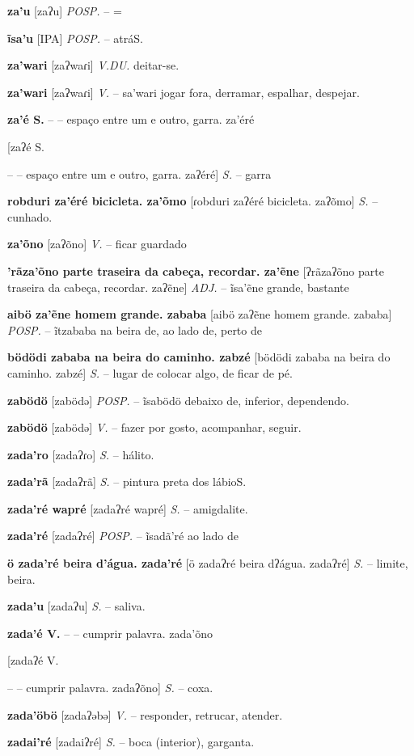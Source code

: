 {{{{{{{{{{{{\textbf{za'u} [zaʔu] \textit{POSP.} -- =

\textbf{ĩsa'u} [IPA] \textit{POSP.} -- atráS.}

\textbf{za'wari} [zaʔwaɾi] \textit{V.DU.} deitar-se.

\textbf{za'wari} [zaʔwaɾi] \textit{V.} -- sa'wari jogar fora, derramar, espalhar, despejar.

\textbf{za'é S.} -- -- espaço entre um e outro, garra. za'éré} [zaʔé S.} -- -- espaço entre um e outro, garra. zaʔéré] \textit{S.} -- garra

\textbf{robduri za'éré bicicleta. za'õmo} [ɾobduri zaʔéré bicicleta. zaʔõmo] \textit{S.} -- cunhado.

\textbf{za'õno} [zaʔõno] \textit{V.} -- ficar guardado

\textbf{'rãza'õno parte traseira da cabeça, recordar. za'ẽne} [ʔrãzaʔõno parte traseira da cabeça, recordar. zaʔẽne] \textit{ADJ.} -- ĩsa'ẽne grande, bastante

\textbf{aibö za'ẽne homem grande. zababa} [aibö zaʔẽne homem grande. zababa] \textit{POSP.} -- ĩtzababa na beira de, ao lado de, perto de

\textbf{bödödi zababa na beira do caminho. zabzé} [bödödi zababa na beira do caminho. zabzé] \textit{S.} -- lugar de colocar algo, de ficar de pé.

\textbf{zabödö} [zabödə] \textit{POSP.} -- ĩsabödö debaixo de, inferior, dependendo.

\textbf{zabödö} [zabödə] \textit{V.} -- fazer por gosto, acompanhar, seguir.

\textbf{zada'ro} [zadaʔɾo] \textit{S.} -- hálito.

\textbf{zada'rã} [zadaʔrã] \textit{S.} -- pintura preta dos lábioS.}

\textbf{zada'ré wapré} [zadaʔré wapré] \textit{S.} -- amigdalite.

\textbf{zada'ré} [zadaʔré] \textit{POSP.} -- ĩsadã'ré ao lado de

\textbf{ö zada'ré beira d'água. zada'ré} [ö zadaʔré beira dʔágua. zadaʔré] \textit{S.} -- limite, beira.

\textbf{zada'u} [zadaʔu] \textit{S.} -- saliva.

\textbf{zada'é V.} -- -- cumprir palavra. zada'õno} [zadaʔé V.} -- -- cumprir palavra. zadaʔõno] \textit{S.} -- coxa.

\textbf{zada'öbö} [zadaʔəbə] \textit{V.} -- responder, retrucar, atender.

\textbf{zadai'ré} [zadaiʔré] \textit{S.} -- boca (interior), garganta.

}}}}}}
